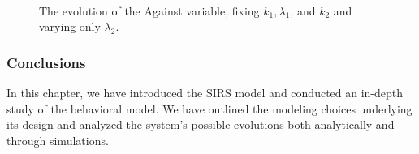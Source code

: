 \begin{figure}
	\centering
	 \quad
	 \\
		\caption[Max against first case]{The evolution of the Against variable, fixing $k_1, \lambda_1$, and $k_2$ and varying only  $\lambda_2$.}
	\label{fig:max_against2}
\end{figure}

\subsubsection{Conclusions}


In this chapter, we have introduced the SIRS model and conducted an in-depth study of the behavioral model. We have outlined the modeling choices underlying its design and analyzed the system's possible evolutions both analytically and through simulations. 

